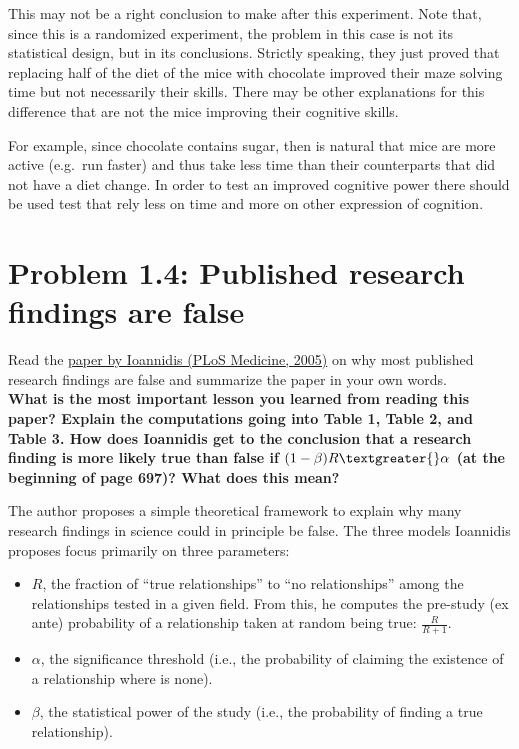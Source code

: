 \documentclass[11pt, english]{article}
\begin{document}
    This may not be a right conclusion to make after this experiment. Note
that, since this is a randomized experiment, the problem in this case is
not its statistical design, but in its conclusions. Strictly speaking,
they just proved that replacing half of the diet of the mice with
chocolate improved their maze solving time but not necessarily their
skills. There may be other explanations for this difference that are not
the mice improving their cognitive skills.

For example, since chocolate contains sugar, then is natural that mice
are more active (e.g.~run faster) and thus take less time than their
counterparts that did not have a diet change. In order to test an
improved cognitive power there should be used test that rely less on
time and more on other expression of cognition.

    \hypertarget{problem-1.4-published-research-findings-are-false}{%
\section*{\texorpdfstring{\textbf{Problem 1.4:} Published research
findings are
false}{Problem 1.4: Published research findings are false}}\label{problem-1.4-published-research-findings-are-false}}

Read the
\href{https://github.com/pipeton8/6.439-stats-comp-applications/blob/main/Assignments/1\%20-\%20Stats\%20Review/Ioannidis_paper.pdf}{paper
by Ioannidis (PLoS Medicine, 2005)} on why most published research
findings are false and summarize the paper in your own words.\\[2ex] {\bf What is
the most important lesson you learned from reading this paper? Explain
the computations going into Table 1, Table 2, and Table 3. How does
Ioannidis get to the conclusion that a research finding is more likely
true than false if $(1 - \beta)R \textgreater{} \alpha $ (at the
beginning of page 697)? What does this mean?}

    The author proposes a simple theoretical framework to explain why many
research findings in science could in principle be false. The three
models Ioannidis proposes focus primarily on three parameters:
\begin{itemize}
\item \(R\), the fraction of ``true relationships'' to ``no relationships''
among the relationships tested in a given field. From this, he computes
the pre-study (ex ante) probability of a relationship taken at random
being true: \(\frac{R}{R+1}\).

\item \(\alpha\), the significance threshold (i.e., the probability of
claiming the existence of a relationship where is none).

\item \(\beta\), the statistical power of the study (i.e., the probability of
finding a true relationship).
\end{itemize}
\end{document}
